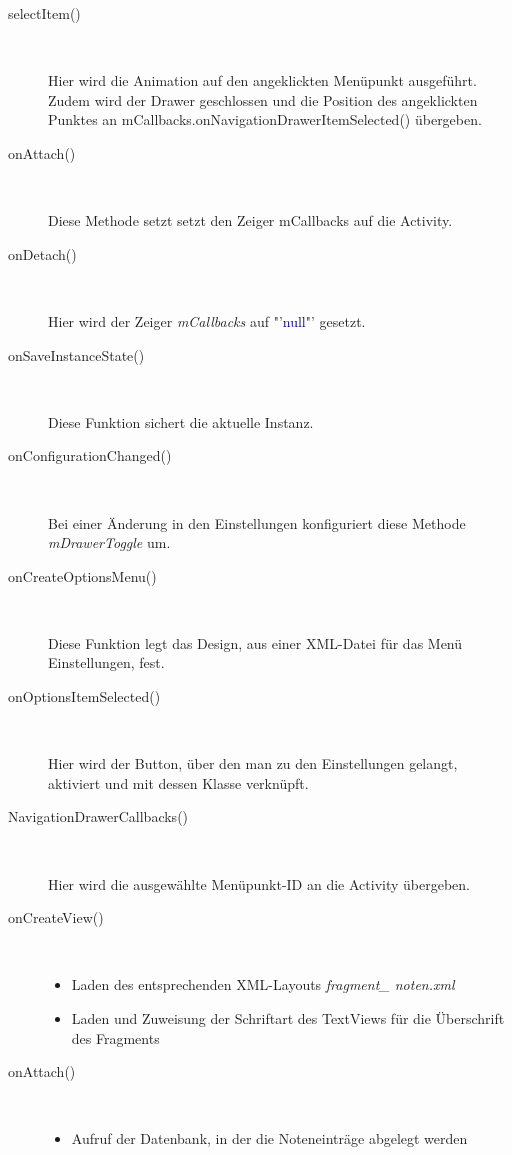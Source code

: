 \begin{description}
\item[selectItem()]~\par
Hier wird die Animation auf den angeklickten Menüpunkt ausgeführt.
Zudem wird der Drawer geschlossen und die Position des angeklickten Punktes an mCallbacks.onNavigationDrawerItemSelected() übergeben.
 
\item[onAttach()]~\par
Diese Methode setzt setzt den Zeiger mCallbacks auf die Activity.
 
\item[onDetach()]~\par
Hier wird der Zeiger \textit{mCallbacks} auf "'\textcolor{darkblue}{null}"' gesetzt.

\item[onSaveInstanceState()]~\par
Diese Funktion sichert die aktuelle Instanz.

\item[onConfigurationChanged()]~\par
Bei einer Änderung in den Einstellungen konfiguriert diese Methode \textit{mDrawerToggle} um.
 
\item[onCreateOptionsMenu()]~\par
Diese Funktion legt das Design, aus einer XML-Datei für das Menü Einstellungen, fest.
 
\item[onOptionsItemSelected()]~\par
Hier wird der Button, über den man zu den Einstellungen gelangt, aktiviert und mit dessen Klasse verknüpft.

\item[NavigationDrawerCallbacks()]~\par
Hier wird die ausgewählte Menüpunkt-ID an die Activity übergeben.

\item[onCreateView()]~\par
\begin{itemize}
\item Laden des entsprechenden XML-Layouts \textit{fragment\_ noten.xml}
\item Laden und Zuweisung der Schriftart des TextViews für die Überschrift des Fragments
\end{itemize}

\item[onAttach()]~\par
\begin{itemize}
\item Aufruf der Datenbank, in der die Noteneinträge abgelegt werden
\end{itemize}


\end{description}
